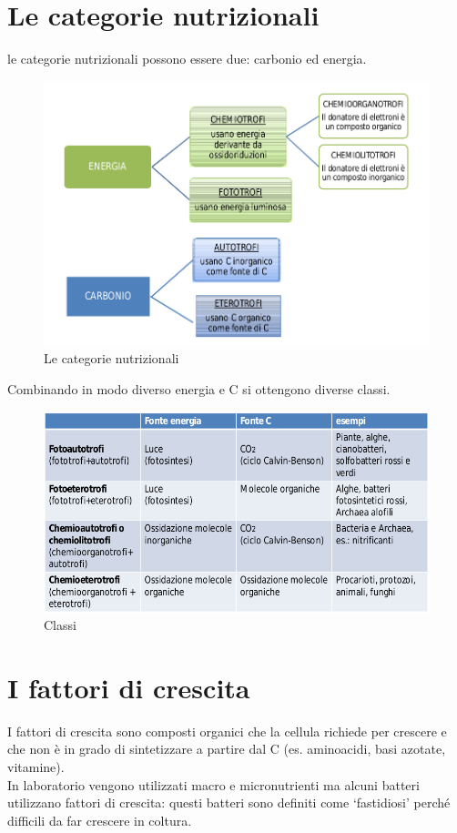 \documentclass[11pt]{book}
\begin{document}
\clearpage
\section{Le categorie nutrizionali}
le categorie nutrizionali possono essere due: carbonio ed energia.

\begin{figure}[htp]
\centering
\includegraphics[scale=0.4]{img/Categorie nutrizionali.png}
\caption{Le categorie nutrizionali}
\label{}
\end{figure}

Combinando in modo diverso energia e C si ottengono diverse classi.

\begin{figure}[htp]
\centering
\includegraphics[scale=0.4]{img/Combinazioni energia e carbonio.png}
\caption{Classi}
\label{}
\end{figure}

\section{I fattori di crescita}
I fattori di crescita sono composti organici che la cellula richiede per crescere e che non è in grado di sintetizzare a partire dal C (es. aminoacidi, basi azotate, vitamine).\\
In laboratorio vengono utilizzati macro e micronutrienti ma alcuni batteri utilizzano fattori di crescita: questi batteri sono definiti come ‘fastidiosi’ perché difficili da far crescere in coltura.
\end{document}
